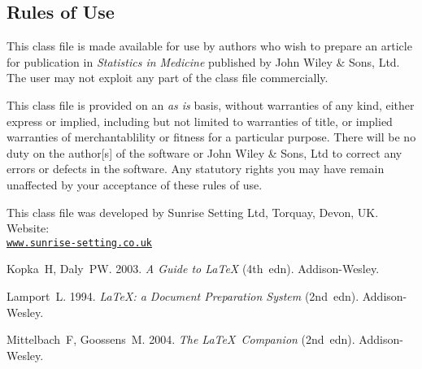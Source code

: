 \documentclass[times]{simauth}
\begin{document}
\subsection{Rules of Use}
This class file is made available for use by authors who wish to
prepare an article for publication in \emph{Statistics in
Medicine} published by John Wiley \& Sons, Ltd.  The user may not
exploit any part of the class file commercially.

This class file is provided on an \emph{as is}  basis, without
warranties of any kind, either express or implied, including but
not limited to warranties of title, or implied  warranties of
merchantablility or fitness for a particular purpose. There will
be no duty on the author[s] of the software or  John Wiley \&
Sons, Ltd to correct any errors or defects in the software. Any
statutory  rights you may have remain unaffected by your
acceptance of these rules of use.

\ack This class file was developed by Sunrise Setting Ltd,
Torquay, Devon, UK. Website:\\
\href{http://www.sunrise-setting.co.uk}{\texttt{www.sunrise-setting.co.uk}}

\begin{thebibliography}{9}

 Kopka~H, Daly~PW. 2003. \emph{A Guide to \LaTeX} (4th~edn).
Addison-Wesley.

 Lamport~L. 1994. \emph{\LaTeX: a Document Preparation System} (2nd~edn).
Addison-Wesley.

 Mittelbach~F, Goossens~M. 2004. \emph{The \LaTeX\ Companion}
(2nd~edn). Addison-Wesley.
\end{thebibliography}
\end{document}
